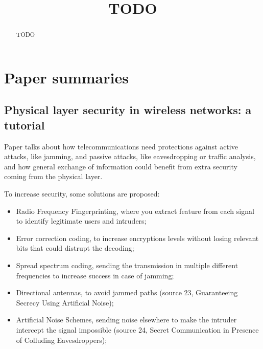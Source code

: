 \documentclass[conference]{IEEEtran}
\begin{document}
\title{TODO}


\author{
}

\maketitle

\begin{abstract}
  TODO
\end{abstract}


\IEEEpeerreviewmaketitle

\section{Paper summaries}

\subsection{Physical layer security in wireless networks: a tutorial}
Paper \cite{5751298} talks about how telecommunications need protections against active attacks, like jamming, and passive attacks, like eavesdropping or traffic analysis, and how general exchange of information could benefit from extra security coming from the physical layer.

To increase security, some solutions are proposed:
\begin{itemize}
  \item Radio Frequency Fingerprinting, where you extract feature from each signal to identify legitimate users and intruders;
  \item Error correction coding, to increase encryptions levels without losing relevant bits that could distrupt the decoding;
  \item Spread spectrum coding, sending the transmission in multiple different frequencies to increase success in case of jamming;
  \item Directional antennas, to avoid jammed paths (source 23, Guaranteeing Secrecy Using Artificial Noise);
  \item Artificial Noise Schemes, sending noise elsewhere to make the intruder intercept the signal impossible (source 24, Secret Communication in Presence of Colluding Eavesdroppers);
\end{itemize}
\end{document}
